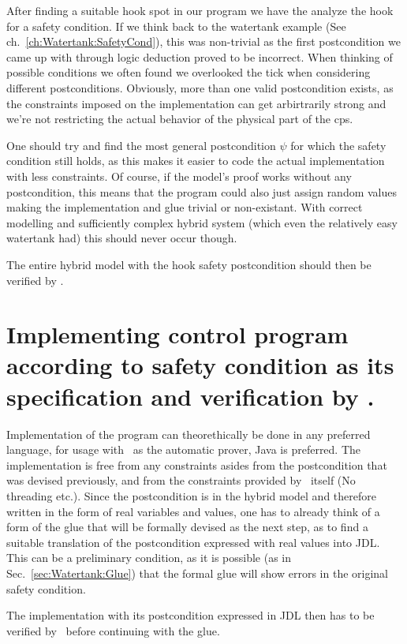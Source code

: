 After finding a suitable hook spot in our program we have the analyze the hook for a safety condition. If we think back to the watertank example (See ch.~\ref{ch:Watertank:SafetyCond}), this was non-trivial as the first postcondition we came up with through logic deduction proved to be incorrect. When thinking of possible conditions we often found we overlooked the tick when considering different postconditions. Obviously, more than one valid postcondition exists, as the constraints imposed on the implementation can get arbirtrarily strong and we're not restricting the actual behavior of the physical part of the cps. 

One should try and find the most general postcondition \(\psi\) for which the safety condition still holds, as this makes it easier to code the actual implementation with less constraints. Of course, if the model's proof works without any postcondition, this means that the program could also just assign random values making the implementation and glue trivial or non-existant. With correct modelling and sufficiently complex hybrid system (which even the relatively easy watertank had) this should never occur though.

The entire hybrid model with the hook safety postcondition should then be verified by \keym.

\section{Implementing control program according to safety condition as its specification and verification by \key.}
\label{sec:Process:Implementation}

Implementation of the program can theorethically be done in any preferred language, for usage with \key~as the automatic prover, Java is preferred. The implementation is free from any constraints asides from the postcondition that was devised previously, and from the constraints provided by \key~itself (No threading etc.). Since the postcondition is in the hybrid model and therefore written in the form of real variables and values, one has to already think of a form of the glue that will be formally devised as the next step, as to find a suitable translation of the postcondition expressed with real values into JDL. This can be a preliminary condition, as it is possible (as in Sec.~\ref{sec:Watertank:Glue}) that the formal glue will show errors in the original safety condition.

The implementation with its postcondition expressed in JDL then has to be verified by \key~before continuing with the glue. 

